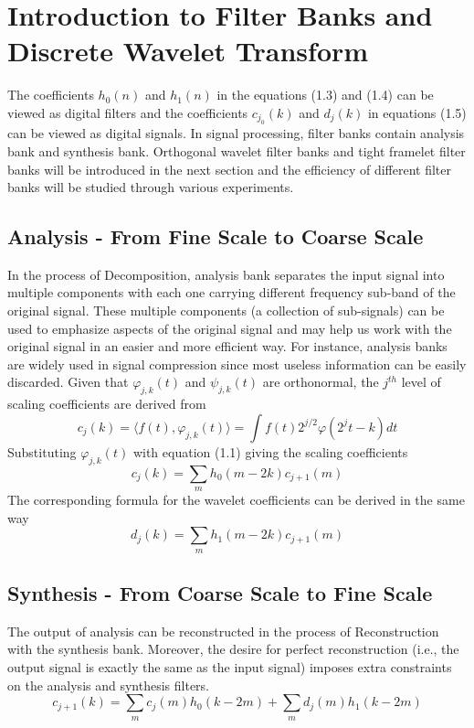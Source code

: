 \section{Introduction to Filter Banks and Discrete Wavelet Transform}
The coefficients $h_0(n)$ and $h_1(n)$ in the equations (1.3) and (1.4) can be viewed as digital filters and the coefficients $c_{j_0}(k)$ and $d_j(k)$ in equations (1.5) can be viewed as digital signals. In signal processing, filter banks contain analysis bank and synthesis bank. Orthogonal wavelet filter banks and tight framelet filter banks will be introduced in the next section and the efficiency of different filter banks will be studied through various experiments.

\subsection{Analysis - From Fine Scale to Coarse Scale}
In the process of Decomposition, analysis bank separates the input signal into multiple components with each one carrying different frequency sub-band of the original signal. These multiple components (a collection of sub-signals) can be used to emphasize aspects of the original signal and may help us work with the original signal in an easier and more efficient way. For instance, analysis banks are widely used in signal compression since most useless information can be easily discarded.
Given that $\varphi_{j,k}(t)$ and $\psi_{j,k}(t)$ are orthonormal, the $j^{th}$ level of scaling coefficients are derived from 
\begin{equation} c_j(k) = \langle f(t),\varphi_{j,k}(t)\rangle = \int f(t)2^{j/2}\varphi(2^jt-k)dt \end{equation}
Substituting $\varphi_{j,k}(t)$ with equation (1.1) giving the scaling coefficients
\begin{equation} c_j(k) = \sum_m h_0(m-2k)c_{j+1}(m) \end{equation}
The corresponding formula for the wavelet coefficients can be derived in the same way
\begin{equation} d_j(k) = \sum_m h_1(m-2k)c_{j+1}(m)\end{equation}

\subsection{Synthesis - From Coarse Scale to Fine Scale}
 The output of analysis can be reconstructed in the process of Reconstruction with the synthesis bank. Moreover, the desire for perfect reconstruction (i.e., the output signal is exactly the same as the input signal) imposes extra constraints on the analysis and synthesis filters.
 \begin{equation} c_{j+1}(k) = \sum_mc_j(m)h_0(k-2m) + \sum_md_j(m)h_1(k-2m) \end{equation}


